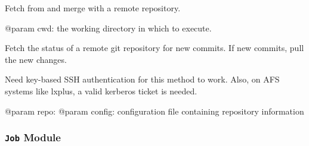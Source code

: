 \documentclass[a4paper,11pt,openany]{sphinxmanual}
\begin{document}
\begin{fulllineitems}
\label{ref-manual/XrdTest:XrdTest.GitUtils.git_pull}
Fetch from and merge with a remote repository.

@param cwd: the working directory in which to execute.

\end{fulllineitems}


\begin{fulllineitems}
\label{ref-manual/XrdTest:XrdTest.GitUtils.sync_remote_git}
Fetch the status of a remote git repository for new commits. If
new commits, pull the new changes.

Need key-based SSH authentication for this method to work. Also, on AFS
systems like lxplus, a valid kerberos ticket is needed.

@param repo: 
@param config: configuration file containing repository information

\end{fulllineitems}



\subsubsection{\texttt{Job} Module}
\label{ref-manual/XrdTest:job-module}\label{ref-manual/XrdTest:module-XrdTest.Job}
\end{document}
